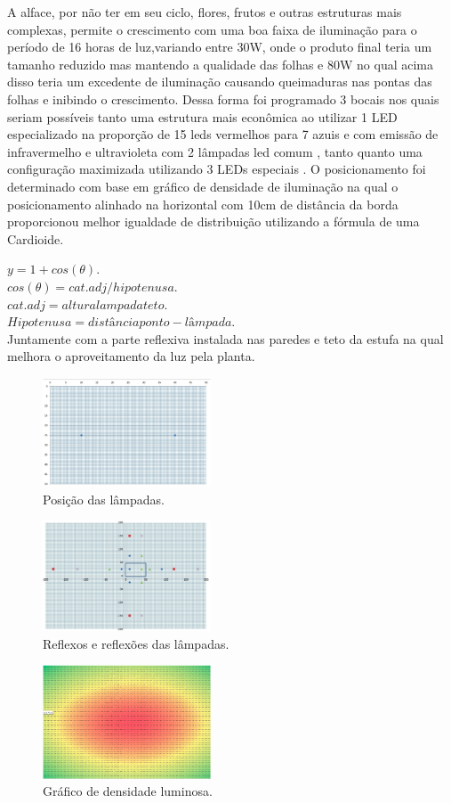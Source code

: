 A alface, por não ter em seu ciclo, flores, frutos e outras estruturas mais complexas, permite o crescimento com uma boa faixa de iluminação para o período de 16 horas de luz,variando entre 30W, onde o produto final teria um tamanho reduzido mas mantendo a qualidade das folhas e 80W no qual acima disso teria um excedente de iluminação causando queimaduras nas pontas das folhas e inibindo o crescimento.
Dessa forma foi programado 3 bocais nos quais seriam possíveis tanto uma estrutura mais econômica  ao utilizar 1 LED especializado na proporção de 15 leds vermelhos para 7 azuis e com emissão de infravermelho e ultravioleta com 2 lâmpadas led comum , tanto  quanto uma configuração maximizada utilizando 3 LEDs especiais .
O posicionamento foi determinado com base em gráfico de densidade de iluminação na qual o posicionamento alinhado na horizontal com 10cm de distância da borda proporcionou melhor igualdade de distribuição utilizando a fórmula de uma Cardioide.

$y=1+cos(\theta).$\\
$cos(\theta)=cat.adj/hipotenusa.$\\
$cat.adj=altura lampada teto.$\\
$Hipotenusa=distância ponto-lâmpada.$\\

Juntamente com a parte reflexiva instalada nas paredes e teto da estufa na qual melhora o aproveitamento da luz pela planta.

\begin{figure}[H]
	\centering
	\includegraphics[width=5cm]{figuras/posicao_lampadas.png}
	\caption{Posição das lâmpadas.}
	\label{posicao_lampadas}
\end{figure}

\begin{figure}[H]
	\centering
	\includegraphics[width=5cm]{figuras/reflexos_lampadas.png}
	\caption{Reflexos e reflexões das lâmpadas.}
	\label{reflexos_lampadas}
\end{figure}

\begin{figure}[H]
	\centering
	\includegraphics[width=5cm]{figuras/grafico_luminosa.png}
	\caption{Gráfico de densidade luminosa.}
	\label{grafico_luminosa}
\end{figure}
